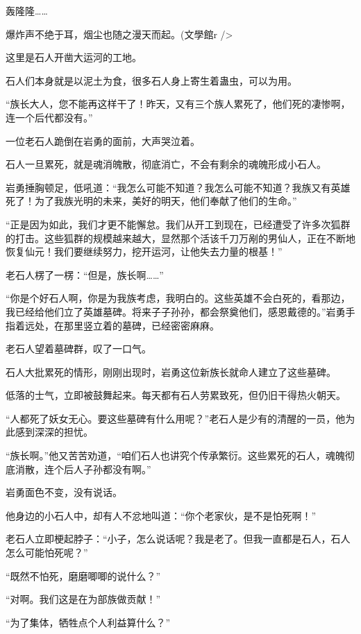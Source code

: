 
\begin{this_body}

轰隆隆……

爆炸声不绝于耳，烟尘也随之漫天而起。(文學館r />

这里是石人开凿大运河的工地。

石人们本身就是以泥土为食，很多石人身上寄生着蛊虫，可以为用。

“族长大人，您不能再这样干了！昨天，又有三个族人累死了，他们死的凄惨啊，连一个后代都没有。”

一位老石人跪倒在岩勇的面前，大声哭泣着。

石人一旦累死，就是魂消魄散，彻底消亡，不会有剩余的魂魄形成小石人。

岩勇捶胸顿足，低吼道：“我怎么可能不知道？我怎么可能不知道？我族又有英雄死了！为了我族光明的未来，美好的明天，他们奉献了他们的生命。”

“正是因为如此，我们才更不能懈怠。我们从开工到现在，已经遭受了许多次狐群的打击。这些狐群的规模越来越大，显然那个活该千刀万剐的男仙人，正在不断地恢复仙元！我们要继续努力，挖开运河，让他失去力量的根基！”

老石人楞了一楞：“但是，族长啊……”

“你是个好石人啊，你是为我族考虑，我明白的。这些英雄不会白死的，看那边，我已经给他们立了英雄墓碑。将来子子孙孙，都会祭奠他们，感恩戴德的。”岩勇手指着远处，在那里竖立着的墓碑，已经密密麻麻。

老石人望着墓碑群，叹了一口气。

石人大批累死的情形，刚刚出现时，岩勇这位新族长就命人建立了这些墓碑。

低落的士气，立即被鼓舞起来。每天都有石人劳累致死，但仍旧干得热火朝天。

“人都死了妖女无心。要这些墓碑有什么用呢？”老石人是少有的清醒的一员，他为此感到深深的担忧。

“族长啊。”他又苦苦劝道，“咱们石人也讲究个传承繁衍。这些累死的石人，魂魄彻底消散，连个后人子孙都没有啊。”

岩勇面色不变，没有说话。

他身边的小石人中，却有人不忿地叫道：“你个老家伙，是不是怕死啊！”

老石人立即梗起脖子：“小子，怎么说话呢？我是老了。但我一直都是石人，石人怎么可能怕死呢？”

“既然不怕死，磨磨唧唧的说什么？”

“对啊。我们这是在为部族做贡献！”

“为了集体，牺牲点个人利益算什么？”


\end{this_body}
